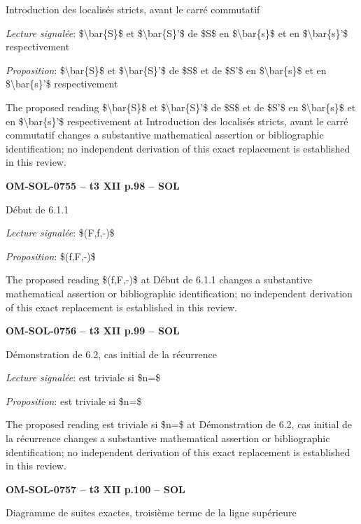 Introduction des localisés stricts, avant le carré commutatif\par
\emph{Lecture signalée}: \$\textbackslash{}bar\{S\}\$ et \$\textbackslash{}bar\{S\}'\$ de \$S\$ en \$\textbackslash{}bar\{s\}\$ et en \$\textbackslash{}bar\{s\}'\$ respectivement\par
\emph{Proposition}: \$\textbackslash{}bar\{S\}\$ et \$\textbackslash{}bar\{S\}'\$ de \$S\$ et de \$S'\$ en \$\textbackslash{}bar\{s\}\$ et en \$\textbackslash{}bar\{s\}'\$ respectivement\par
The proposed reading \$\textbackslash{}bar\{S\}\$ et \$\textbackslash{}bar\{S\}'\$ de \$S\$ et de \$S'\$ en \$\textbackslash{}bar\{s\}\$ et en \$\textbackslash{}bar\{s\}'\$ respectivement at Introduction des localisés stricts, avant le carré commutatif changes a substantive mathematical assertion or bibliographic identification; no independent derivation of this exact replacement is established in this review.\par
\par\noindent\textbf{OM-SOL-0755 -- t3 XII p.98 -- SOL}\par
Début de 6.1.1\par
\emph{Lecture signalée}: \$(F,f,-)\$\par
\emph{Proposition}: \$(f,F,-)\$\par
The proposed reading \$(f,F,-)\$ at Début de 6.1.1 changes a substantive mathematical assertion or bibliographic identification; no independent derivation of this exact replacement is established in this review.\par
\par\noindent\textbf{OM-SOL-0756 -- t3 XII p.99 -- SOL}\par
Démonstration de 6.2, cas initial de la récurrence\par
\emph{Lecture signalée}: est triviale si \$n=\$\par
\emph{Proposition}: est triviale si \$n=\$\par
The proposed reading est triviale si \$n=\$ at Démonstration de 6.2, cas initial de la récurrence changes a substantive mathematical assertion or bibliographic identification; no independent derivation of this exact replacement is established in this review.\par
\par\noindent\textbf{OM-SOL-0757 -- t3 XII p.100 -- SOL}\par
Diagramme de suites exactes, troisième terme de la ligne supérieure\par
